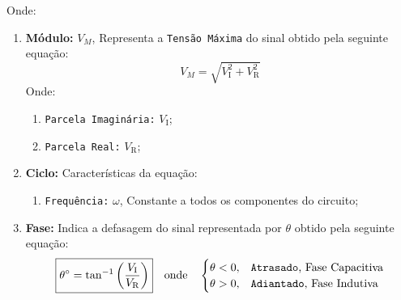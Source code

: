 \documentclass{article}
\begin{document}
        Onde:
            \begin{enumerate}
                \item \textbf{Módulo:} $V_{M}$, Representa a \texttt{Tensão Máxima} do sinal obtido pela seguinte equação:
                    \begin{equation*}
                        \boxed{
                            V_{M} = \sqrt{
                                V_{\text{I}}^{2} + V_{\text{R}}^{2}
                            }
                        }
                    \end{equation*}
                Onde:
                    \begin{enumerate}[noitemsep, rightmargin = \leftmargin]
                        \item \texttt{Parcela Imaginária:} $V_{\text{I}}$;

                        \item \texttt{Parcela Real:} $V_{\text{R}}$;
                    \end{enumerate}


                \item \textbf{Ciclo:} Características da equação:
                    \begin{enumerate}[noitemsep, rightmargin = \leftmargin]
                        \item \texttt{Frequência:} $\omega$, Constante a todos os componentes do circuito;
                    \end{enumerate}

                \item \textbf{Fase:} Indica a defasagem do sinal representada por $\theta$ obtido pela seguinte equação:
                    \begin{equation*}
                        \boxed{
                            \theta^{\circ} = \tan^{-1}
                            \left(
                                \frac{V_{\text{I}}}{V_{\text{R}}}
                            \right)
                        }
                        \quad
                        \text{onde}
                        \quad
                        \begin{cases}
                            \theta < 0, & \text{\texttt{Atrasado}, Fase Capacitiva}\\
                            \theta > 0, & \text{\texttt{Adiantado}, Fase Indutiva}
                        \end{cases}
                    \end{equation*}
            \end{enumerate}
\end{document}
